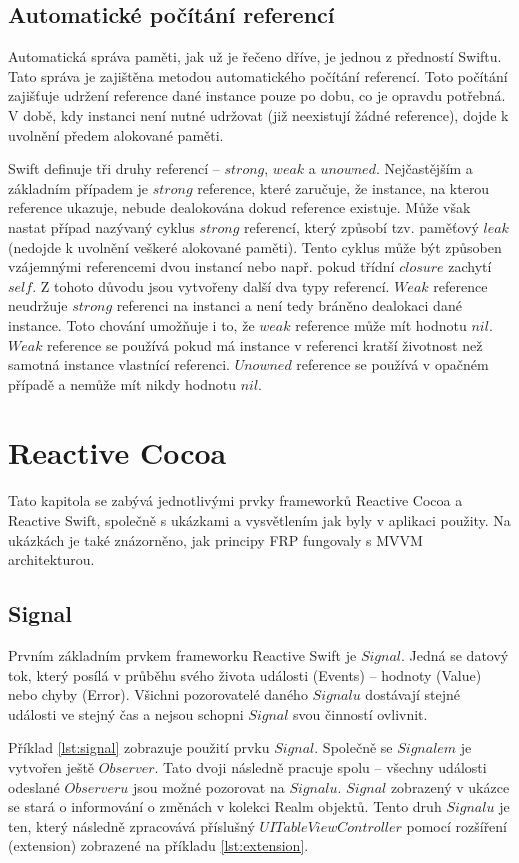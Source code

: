 \documentclass[thesis=M,czech]{FITthesis}[2012/06/26]
\begin{document}
\subsection{Automatické počítání referencí}
Automatická správa paměti, jak už je řečeno dříve, je jednou z předností Swiftu. Tato správa je zajištěna metodou automatického počítání referencí. Toto počítání zajišťuje udržení reference dané instance pouze po dobu, co je opravdu potřebná. V době, kdy instanci není nutné udržovat (již neexistují žádné reference), dojde k uvolnění předem alokované paměti.

Swift definuje tři druhy referencí -- $strong$, $weak$ a $unowned$. Nejčastějším a základním případem je $strong$ reference, které zaručuje, že instance, na kterou reference ukazuje, nebude dealokována dokud reference existuje. Může však nastat případ nazývaný cyklus $strong$ referencí, který způsobí tzv. paměťový $leak$ (nedojde k uvolnění veškeré alokované paměti). Tento cyklus může být způsoben vzájemnými referencemi dvou instancí nebo např. pokud třídní $closure$ zachytí $self$. Z tohoto důvodu jsou vytvořeny další dva typy referencí. $Weak$ reference neudržuje $strong$ referenci na instanci a není tedy bráněno dealokaci dané instance. Toto chování umožňuje i to, že $weak$ reference může mít hodnotu $nil$. $Weak$ reference se používá pokud má instance v referenci kratší životnost než samotná instance vlastnící referenci. $Unowned$ reference se používá v opačném případě a nemůže mít nikdy hodnotu $nil$. \cite{devMemory}

\section{Reactive Cocoa}
Tato kapitola se zabývá jednotlivými prvky frameworků Reactive Cocoa a Reactive Swift, společně s ukázkami a vysvětlením jak byly v aplikaci použity. Na ukázkách je také znázorněno, jak principy FRP fungovaly s MVVM architekturou.

\subsection{Signal}
Prvním základním prvkem frameworku Reactive Swift je $Signal$. Jedná se datový tok, který posílá v průběhu svého života události (Events) -- hodnoty (Value) nebo chyby (Error). Všichni pozorovatelé daného $Signalu$ dostávají stejné události ve stejný čas a nejsou schopni $Signal$ svou činností ovlivnit. \cite{signal}

Příklad \ref{lst:signal} zobrazuje použití prvku $Signal$. Společně se $Signalem$ je vytvořen ještě $Observer$. Tato dvoji následně pracuje spolu -- všechny události odeslané $Observeru$ jsou možné pozorovat na $Signalu$. $Signal$ zobrazený v ukázce se stará o informování o změnách v kolekci Realm objektů. Tento druh $Signalu$ je ten, který následně zpracovává příslušný $UITableViewController$ pomocí rozšíření (extension) zobrazené na příkladu \ref{lst:extension}.
\end{document}
